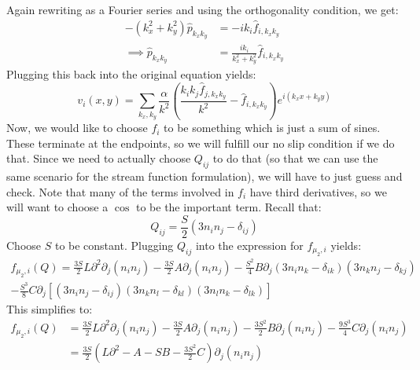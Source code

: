 \documentclass[reqno]{article}
\begin{document}
	Again rewriting as a Fourier series and using the orthogonality condition, we get:
	\begin{equation} \label{eq:p-fourier-components}
	\begin{split}
		-\left( k_x^2 + k_y^2 \right) \hat{p}_{k_x k_y}
		&= -i k_i \hat{f}_{i, k_x k_y} \\
		\implies \hat{p}_{k_x k_y}
		&= \frac{ i k_i }{ k_x^2 + k_y^2 } \hat{f}_{i, k_x k_y}
	\end{split}
	\end{equation}
	Plugging this back into the original equation yields:
	\begin{equation} \label{eq:velocity-fourier-solution}
		v_i(x, y) 
		= \sum_{k_x, k_y} \frac{ \alpha }{ k^2 } \left(
		\frac{ k_i k_j \hat{f}_{j, k_x k_y} }{k^2}
		- \hat{f}_{i, k_x k_y}
		\right)
		e^{ i \left( k_x x + k_y y \right) }
	\end{equation}
	Now, we would like to choose $f_i$ to be something which is just a sum of sines.
	These terminate at the endpoints, so we will fulfill our no slip condition if we do that.
	Since we need to actually choose $Q_{ij}$ to do that (so that we can use the same scenario for the stream function formulation), we will have to just guess and check.
	Note that many of the terms involved in $f_i$ have third derivatives, so we will want to choose a $\cos$ to be the important term. 
	Recall that:
	\begin{equation}
		Q_{ij} 
		= \frac{S}{2} \left( 3 n_i n_j - \delta_{ij} \right)
	\end{equation}
	Choose $S$ to be constant. 
	Plugging $Q_{ij}$ into the expression for $f_{\mu_2, i}$ yields:
	\begin{multline}
		f_{\mu_2, i} (Q)
		= \frac{3 S}{2} L \partial^2 \partial_j \left( n_i n_j \right)
		- \frac{3 S}{2} A \partial_j \left( n_i n_j \right)
		- \frac{S^2}{4} B \partial_j 
		\left( 3 n_i n_k - \delta_{ik} \right)
		\left( 3 n_k n_j - \delta_{kj} \right)\\
		- \frac{S^3}{8} C \partial_j
		\left[
		\left( 3 n_i n_j - \delta_{ij} \right)
		\left( 3 n_k n_l - \delta_{kl} \right)
		\left( 3 n_l n_k - \delta_{lk} \right)
		\right]
	\end{multline}
	This simplifies to:
	\begin{equation}
	\begin{split}
		f_{\mu_2, i} (Q)
		&= \frac{3 S}{2} L \partial^2 \partial_j \left( n_i n_j \right)
		- \frac{3 S}{2} A \partial_j \left( n_i n_j \right)
		- \frac{3 S^2}{2} B \partial_j \left( n_i n_j \right)
		- \frac{9 S^3}{4} C \partial_j
		\left( n_i n_j \right) \\
		&= \frac{3 S}{2} 
		\left(
		L \partial^2 - A - S B - \frac{3 S^2}{2} C
		\right)
		\partial_j \left( n_i n_j \right)
	\end{split}
	\end{equation}
\end{document}
